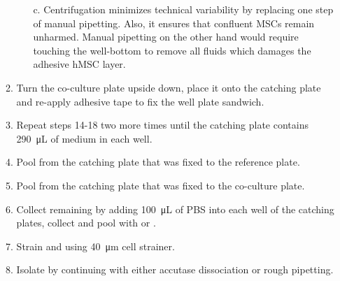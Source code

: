 \begin{itemize}
\begin{enumerate}
\begin{itemize}
                        \item[c.] Centrifugation minimizes technical variability by replacing one step of manual pipetting. Also, it ensures that confluent MSCs remain unharmed. Manual pipetting on the other hand would require touching the well-bottom to remove all fluids which damages the adhesive hMSC layer.
                    \end{itemize}
              \item Turn the co-culture plate upside down, place it onto the catching plate and re-apply adhesive tape to fix the well plate sandwich.
              \item Repeat steps 14-18 two more times until the catching plate contains \SI{290}{\micro\liter} of medium in each well.
              \item Pool \CMina from the catching plate that was fixed to the reference plate.
              \item Pool \nMAina from the catching plate that was fixed to the co-culture plate.
              \item Collect remaining \INA by adding \SI{100}{\micro\liter} of PBS into each well of the catching plates, collect and pool with \CMina or \nMAina.
              \item Strain \CMina and \nMAina using \SI{40}{\micro\meter} cell strainer.
              \item Isolate \MAina by continuing with either accutase dissociation or rough pipetting.
          \end{enumerate}


\end{itemize}
